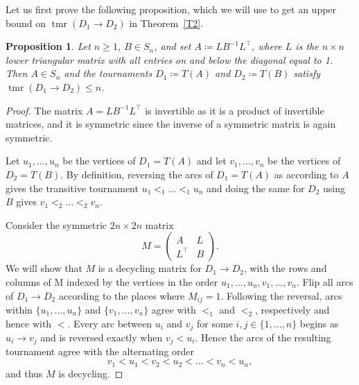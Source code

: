 \documentclass[a4paper, 12pt, reqno]{amsart}
\numberwithin{equation}{section}
\theoremstyle{plain}
\newtheorem{prop}[thm]{Proposition}
\theoremstyle{remark}
\theoremstyle{definition}
\newcommand{\tmr}{\operatorname{tmr}}
\begin{document}
\bigskip

Let us first prove the following proposition, which we will use to get an upper bound on $\tmr(D_1 \rightarrow D_2)$ in Theorem~\ref{T2}.

\begin{prop} \label{propcon}
    Let $n \geq 1$, $B \in S_n$, and set $A \coloneqq LB^{-1}L^{\top}$, where $L$ is the $n \times n$ lower triangular matrix with all entries on and below the diagonal equal to 1. Then $A \in S_n$ and the tournaments
        $D_1 \coloneqq T(A)$ and $D_2 \coloneqq T(B)$ satisfy $\tmr(D_1 \to D_2) \le n$.    
\end{prop}
\begin{proof}
    The matrix $A =  LB^{-1}L^{\top}$ is invertible as it is a product of invertible matrices, and it is symmetric since the inverse of a symmetric matrix is again symmetric. 

     Let $u_1,\ldots,u_n$ be the vertices of $D_1 = T(A)$ and let  $v_1,\ldots,v_n$ be the vertices of $D_2 = T(B)$. 
      By definition, reversing the arcs of $D_1 = T(A)$ as according to $A$ gives the transitive tournament $u_1 <_1 \dots <_1 u_n$ and doing the same for $D_2$ using $B$ gives $v_1 <_2\dots<_2 v_n$.

    Consider the symmetric $2n \times 2n$ matrix
    \begin{equation*}
        M = \begin{pmatrix}
            A &L\\L^{\top} &B
        \end{pmatrix}.
    \end{equation*}
    We will show that $M$ is a decycling matrix for $D_1 \to D_2$, with the rows and columns of M indexed by the vertices in the order $u_1,\ldots,u_n,v_1,\ldots,v_n$. 
    Flip all arcs of $D_1 \to D_2$ according to the places where $M_{ij} = 1$. Following the reversal, arcs within $\{u_1,\ldots,u_n\}$ and $\{v_1,\ldots,v_n\}$ agree with $<_1$ and $<_2$, respectively and hence with $<$. Every arc between $u_i$ and $v_j$ for some $i,j \in \{1,\ldots, n\}$ begins as $u_i \to v_j$ and is reversed exactly when $v_j < u_i$. 
    Hence the arcs of the resulting tournament agree with the alternating order
    \begin{equation*}
        v_1<u_1<v_2<u_2<\dots<v_n<u_n,
    \end{equation*}
   and thus $M$ is decycling. 


\end{proof}
\end{document}
